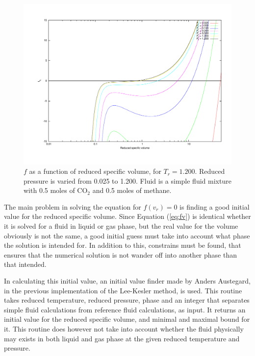 \documentclass[internal,english]{sintefmemo2012}
\numberwithin{equation}{section}
\newcommand*{\reff}[1]{(\ref{#1})}
\begin{document}
\begin{figure}[h]
  \centering
  \includegraphics[trim = 1.5cm 2cm 0 1cm, clip = true, width=14cm]{12Tc_3}
  \caption{$f$ as a function of reduced specific volume, for $T_r = 1.200$. Reduced pressure is varied from 0.025 to 1.200. Fluid is a simple fluid mixture with 0.5 moles of CO$_2$ and 0.5 moles of methane.}
  \label{fig:1.2Tc}
\end{figure}

The main problem in solving the equation for $f(v_r) = 0$ is finding a good initial value for the reduced specific volume. Since Equation \reff{eq:fv} is identical whether it is solved for a fluid in liquid or gas phase, but the real value for the volume obviously is not the same, a good initial guess must take into account what phase the solution is intended for. In addition to this, constrains must be found, that ensures that the numerical solution is not wander off into another phase than that intended. 

In calculating this initial value, an initial value finder made by Anders Austegard, in the previous implementation of the Lee-Kesler method, is used. This routine takes reduced temperature, reduced pressure, phase and an integer that separates simple fluid calculations from reference fluid calculations, as input. It returns an initial value for the reduced specific volume, and minimal and maximal bound for it. This routine does however not take into account whether the fluid physically may exists in both liquid and gas phase at the given reduced temperature and pressure.
\end{document}
